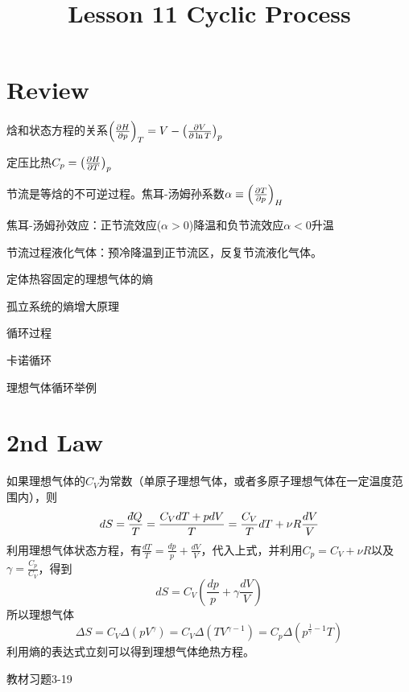 \documentclass[CJK]{beamer}
\title{Lesson 11 Cyclic Process}
\author{}
\date{}
\begin{document}

\section{Review}

\begin{frame}
\bch 
\bitem
\item{焓和状态方程的关系$\left(\frac{\partial H}{\partial p}\right)_{T} = V - \left(\frac{\partial V}{\partial \ln T}\right)_{p}$}
\item{定压比热$C_p = \left(\frac{\partial H}{\partial T}\right)_{p}$}
\item{节流是等焓的不可逆过程。焦耳-汤姆孙系数$\alpha \equiv \left(\frac{\partial T}{\partial p}\right)_{H}$}
\item{焦耳-汤姆孙效应：正节流效应($\alpha >0$)降温和负节流效应$\alpha<0$升温}
\item{节流过程液化气体：预冷降温到正节流区，反复节流液化气体。}
\eitem
\ech
\end{frame}

\begin{frame}
\bch
\bitem
\item{定体热容固定的理想气体的熵}
\item{孤立系统的熵增大原理}
\item{循环过程}
\item{卡诺循环}
\item{理想气体循环举例}
\eitem
\ech
\end{frame}

\section{2nd Law}

\begin{frame}
\bch
如果理想气体的$C_V$为常数（单原子理想气体，或者多原子理想气体在一定温度范围内），则
$$ dS = \frac{\dbar Q}{T} = \frac{C_VdT +  p dV}{T} = \frac{C_V}{T}dT + \nu R\frac{dV}{V} $$
利用理想气体状态方程，有$\frac{dT}{T} = \frac{dp}{p}+\frac{dV}{V}$，代入上式，并利用$C_p = C_V+\nu R$以及$\gamma = \frac{C_p}{C_V}$，得到
$$ dS = C_V \left(\frac{dp}{p} + \gamma \frac{dV}{V}\right)$$
所以{\blue 理想气体 
$$ \Delta S = C_V \Delta \left(pV^\gamma\right) = C_V\Delta\left(TV^{\gamma-1}\right) = C_p\Delta\left(p^{\frac{1}{\gamma}-1}T\right)$$
}
利用熵的表达式立刻可以得到理想气体绝热方程。

\ech
\end{frame}

\begin{frame}
\bch
教材习题3-19
\ech
\end{frame}
\end{document}

